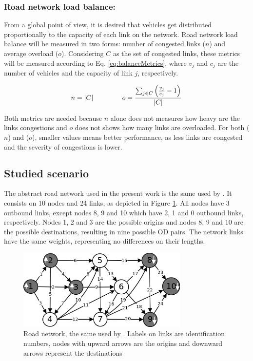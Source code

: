 \documentclass{RITA}
\newcommand{\linkCap}{\ensuremath{c_j}}		%
\newcommand{\veh}{\ensuremath{v}}		%
\newcommand{\congRoads}{\ensuremath{C}}		%
\newcommand{\numCong}{\ensuremath{n}}		%
\newcommand{\overLoadFactor}{\ensuremath{o}}	%
\begin{document}
\subsubsection{Road network load balance:}

From a global point of view, it is desired that vehicles get distributed proportionally to the capacity of each link on the network. Road network load balance will be measured in two forms: number of congested links ($n$) and average overload ($o$). Considering $C$ as the set of congested links, these metrics will be measured according to Eq. \eqref{eq:balanceMetrics}, where $\veh_j$ and $\linkCap$ are the number of vehicles and the capacity of link $j$, respectively. 

\begin{equation}
\label{eq:balanceMetrics}
\numCong = |\congRoads| \hspace{1.5cm}  \overLoadFactor = \frac{ \sum_{\substack{j \in \congRoads}} \left(\frac{\veh_j}{\linkCap} -1 \right)}{|C|}
\end{equation}

Both metrics are needed because $n$ alone does not measures how heavy are the links congestions and $o$ does not shows how many links are overloaded. For both ($n$) and ($o$), smaller values means better performance, as less links are congested and the severity of congestions is lower.

\subsection{Studied scenario} 

The abstract road network used in the present work is the same used by \cite{Galib&Moser2011}. It consists on 10 nodes and 24 links, as depicted in Figure \ref{fig:roadnetwork}. All nodes have 3 outbound links, except nodes 8, 9 and 10 which have 2, 1 and 0 outbound links, respectively. Nodes 1, 2 and 3 are the possible origins and nodes 8, 9 and 10 are the possible destinations, resulting in nine possible OD pairs. The network links have the same weights, representing no differences on their lengths.

\begin{figure}[ht]
    \centerline{\includegraphics[width=8.5cm]{img/roadnetwork.png}}
    \caption{Road network, the same used by \cite{Galib&Moser2011}. Labels on links are identification numbers, nodes with upward arrows are the origins and downward arrows represent the destinations}
    \label{fig:roadnetwork}
\end{figure}
\end{document}
